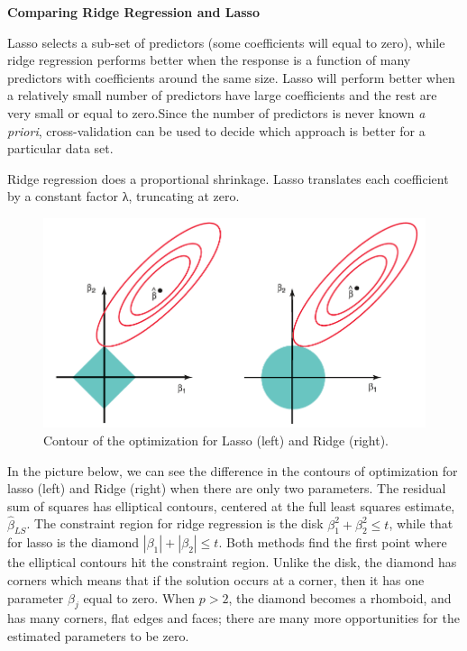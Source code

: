 \documentclass[
]{book}
\begin{document}
\textbf{Comparing Ridge Regression and Lasso}

Lasso selects a sub-set of predictors (some coefficients will equal to zero), while ridge regression performs better when the response is a function of many predictors with coefficients around the same size. Lasso will perform better when a relatively small number of predictors have large coefficients and the rest are very small or equal to zero.Since the number of predictors is never known \emph{a priori}, cross-validation can be used to decide which approach is better for a particular data set.

Ridge regression does a proportional shrinkage. Lasso translates each
coefficient by a constant factor λ, truncating at zero.

\begin{figure}

{\centering \includegraphics[width=0.75\linewidth]{images/week3/ridge-lasso_comparisson} 

}

\caption{Contour of the optimization for Lasso (left) and Ridge (right).}\label{fig:unnamed-chunk-67}
\end{figure}

In the picture below, we can see the difference in the contours of optimization for lasso (left) and Ridge (right) when there are only two parameters. The residual sum of squares has elliptical contours, centered at the full least squares estimate, \(\hat{\beta}_{LS}\). The constraint region for ridge regression is the disk \(\beta_1^2 + \beta_2^2 \leq t\), while that for lasso is the diamond \(|\beta_1| + |\beta_2| \leq t\). Both methods find the first point where the elliptical contours hit the constraint region. Unlike the disk, the diamond has corners which means that if the solution occurs at a corner, then it has one parameter
\(\beta_j\) equal to zero. When \(p>2\), the diamond becomes a rhomboid, and has many corners, flat edges and faces; there are many more opportunities for the estimated parameters to be zero.
\end{document}
